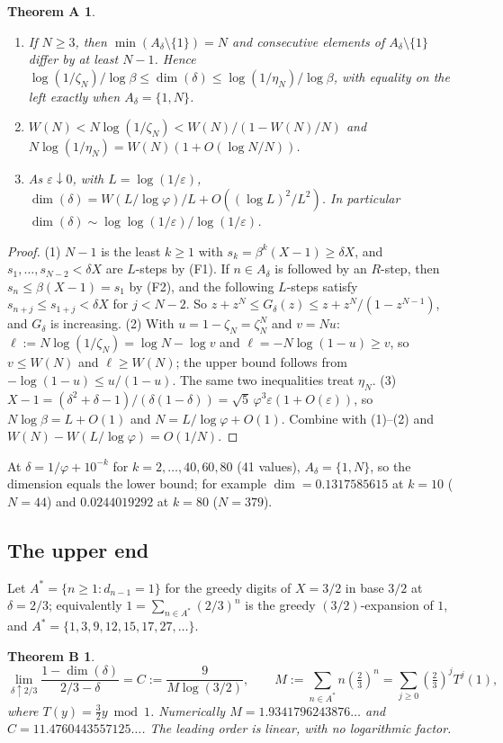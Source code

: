 \documentclass[11pt]{amsart}
\newtheorem*{thmA}{Theorem A}
\newtheorem*{thmB}{Theorem B}
\theoremstyle{remark}
\begin{document}
\begin{thmA}
\begin{enumerate}
\item If $N\ge3$, then $\min(A_\delta\setminus\{1\})=N$ and consecutive elements of $A_\delta\setminus\{1\}$ differ by at least $N-1$. Hence $\log(1/\zeta_N)/\log\beta\le\dim(\delta)\le\log(1/\eta_N)/\log\beta$, with equality on the left exactly when $A_\delta=\{1,N\}$.
\item $W(N)<N\log(1/\zeta_N)<W(N)/(1-W(N)/N)$ and $N\log(1/\eta_N)=W(N)(1+O(\log N/N))$.
\item As $\varepsilon\downarrow0$, with $L=\log(1/\varepsilon)$, $\dim(\delta)=W(L/\log\varphi)/L+O((\log L)^2/L^2)$. In particular $\dim(\delta)\sim\log\log(1/\varepsilon)/\log(1/\varepsilon)$.
\end{enumerate}
\end{thmA}

\begin{proof}
(1) $N-1$ is the least $k\ge1$ with $s_k=\beta^k(X-1)\ge\delta X$, and $s_1,\dots,s_{N-2}<\delta X$ are $L$-steps by (F1). If $n\in A_\delta$ is followed by an $R$-step, then $s_n\le\beta(X-1)=s_1$ by (F2), and the following $L$-steps satisfy $s_{n+j}\le s_{1+j}<\delta X$ for $j<N-2$. So $z+z^N\le G_\delta(z)\le z+z^N/(1-z^{N-1})$, and $G_\delta$ is increasing.
(2) With $u=1-\zeta_N=\zeta_N^N$ and $v=Nu$: $\ell:=N\log(1/\zeta_N)=\log N-\log v$ and $\ell=-N\log(1-u)\ge v$, so $v\le W(N)$ and $\ell\ge W(N)$; the upper bound follows from $-\log(1-u)\le u/(1-u)$. The same two inequalities treat $\eta_N$.
(3) $X-1=(\delta^2+\delta-1)/(\delta(1-\delta))=\sqrt5\,\varphi^3\varepsilon(1+O(\varepsilon))$, so $N\log\beta=L+O(1)$ and $N=L/\log\varphi+O(1)$. Combine with (1)--(2) and $W(N)-W(L/\log\varphi)=O(1/N)$.
\end{proof}

At $\delta=1/\varphi+10^{-k}$ for $k=2,\dots,40,60,80$ (41 values), $A_\delta=\{1,N\}$, so the dimension equals the lower bound; for example $\dim=0.1317585615$ at $k=10$ ($N=44$) and $0.0244019292$ at $k=80$ ($N=379$).

\subsection{The upper end}
Let $A^*=\{n\ge1:d_{n-1}=1\}$ for the greedy digits of $X=3/2$ in base $3/2$ at $\delta=2/3$; equivalently $1=\sum_{n\in A^*}(2/3)^n$ is the greedy $(3/2)$-expansion of $1$, and $A^*=\{1,3,9,12,15,17,27,\dots\}$.

\begin{thmB}
\[
\lim_{\delta\uparrow2/3}\frac{1-\dim(\delta)}{2/3-\delta}=C:=\frac{9}{M\log(3/2)},\qquad M:=\sum_{n\in A^*}n\left(\tfrac23\right)^n=\sum_{j\ge0}\left(\tfrac23\right)^jT^j(1),
\]
where $T(y)=\frac32y\bmod1$. Numerically $M=1.9341796243876\ldots$ and $C=11.4760443557125\ldots$. The leading order is linear, with no logarithmic factor.
\end{thmB}
\end{document}
